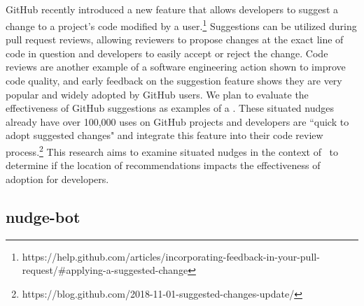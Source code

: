 \subsection{\SUGGS}

GitHub recently introduced a new feature that allows developers to suggest a change to a project's code modified by a user.\footnote{https://help.github.com/articles/incorporating-feedback-in-your-pull-request/\#applying-a-suggested-change} Suggestions can be utilized during pull request reviews, allowing reviewers to propose changes at the exact line of code in question and developers to easily accept or reject the change. Code reviews are another example of a software engineering action shown to improve code quality, and early feedback on the suggestion feature shows they are very popular and widely adopted by GitHub users. We plan to evaluate the effectiveness of GitHub suggestions as examples of a \location. These situated nudges already have over 100,000 uses on GitHub projects and developers are ``quick to adopt suggested changes" and integrate this feature into their code review process.\footnote{https://blog.github.com/2018-11-01-suggested-changes-update/} This research aims to examine situated nudges in the context of \SUGGS~to determine if the location of recommendations impacts the effectiveness of adoption for developers.

\subsection{nudge-bot}

